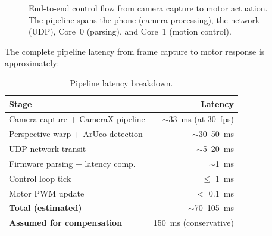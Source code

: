 \documentclass[12pt, a4paper, twoside]{article}
\begin{document}
\begin{figure}[H]
    \caption{End-to-end control flow from camera capture to motor actuation. The pipeline spans the phone (camera processing), the network (UDP), Core~0 (parsing), and Core~1 (motion control).}
    \label{fig:control-flow}
\end{figure}

The complete pipeline latency from frame capture to motor response is approximately:

\begin{table}[H]
    \centering
    \caption{Pipeline latency breakdown.}
    \label{tab:latency}
    \begin{tabular}{@{}lr@{}}
        \toprule
        \textbf{Stage} & \textbf{Latency} \\
        \midrule
        Camera capture + CameraX pipeline & {$\sim$\SI{33}{\milli\second}} (at \SI{30}{fps}) \\
        Perspective warp + ArUco detection & {$\sim$30--\SI{50}{\milli\second}} \\
        UDP network transit                & {$\sim$5--\SI{20}{\milli\second}} \\
        Firmware parsing + latency comp.   & {$\sim$\SI{1}{\milli\second}} \\
        Control loop tick                  & $\leq$ \SI{1}{\milli\second} \\
        Motor PWM update                   & $<$ \SI{0.1}{\milli\second} \\
        \midrule
        \textbf{Total (estimated)}         & {$\sim$70--\SI{105}{\milli\second}} \\
        \textbf{Assumed for compensation}  & \SI{150}{\milli\second} (conservative) \\
        \bottomrule
    \end{tabular}
\end{table}
\end{document}
